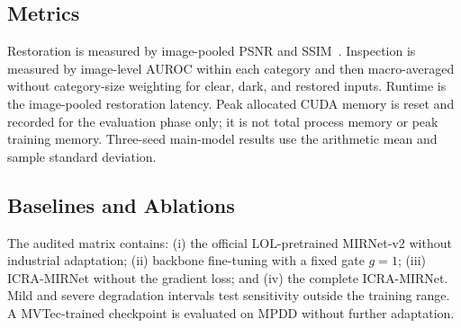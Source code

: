\documentclass[10pt,journal]{IEEEtran}
\begin{document}
\subsection{Metrics}
Restoration is measured by image-pooled PSNR and SSIM~\cite{wang2004ssim}. Inspection is measured by image-level AUROC within each category and then macro-averaged without category-size weighting for clear, dark, and restored inputs. Runtime is the image-pooled restoration latency. Peak allocated CUDA memory is reset and recorded for the evaluation phase only; it is not total process memory or peak training memory. Three-seed main-model results use the arithmetic mean and sample standard deviation.

\subsection{Baselines and Ablations}
The audited matrix contains: (i) the official LOL-pretrained MIRNet-v2 without industrial adaptation; (ii) backbone fine-tuning with a fixed gate $g=1$; (iii) ICRA-MIRNet without the gradient loss; and (iv) the complete ICRA-MIRNet. Mild and severe degradation intervals test sensitivity outside the training range. A MVTec-trained checkpoint is evaluated on MPDD without further adaptation.

\begin{table}[t]
\centering
\caption{MVTec AD results. ICRA-MIRNet reports mean $\pm$ sample standard deviation over seeds 20260830--20260832; the LOL-pretrained baseline and component ablations use seed 20260830. Values are inserted only from validated \texttt{metrics.json} files.}
\label{tab:main}
\scriptsize
{}
\end{table}
\end{document}
